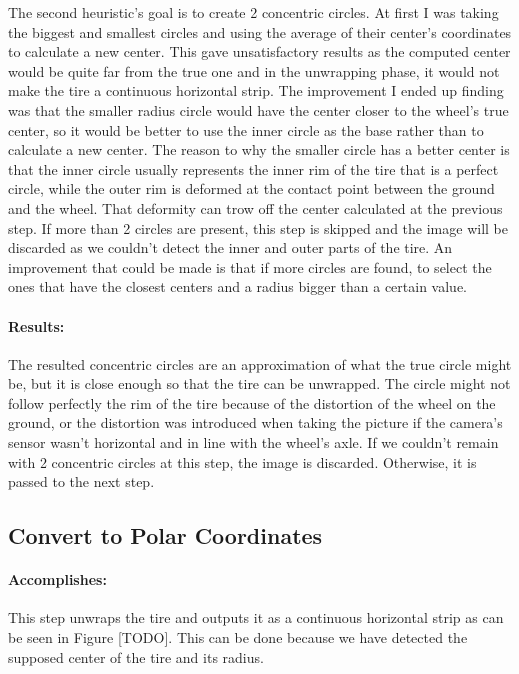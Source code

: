 The second heuristic's goal is to create 2 concentric circles. At first I was taking the biggest and smallest circles and using the average of their center's coordinates to calculate a new center. This gave unsatisfactory results as the computed center would be quite far from the true one and in the unwrapping phase, it would not make the tire a continuous horizontal strip. The improvement I ended up finding was that the smaller radius circle would have the center closer to the wheel's true center, so it would be better to use the inner circle as the base rather than to calculate a new center. The reason to why the smaller circle has a better center is that the inner circle usually represents the inner rim of the tire that is a perfect circle, while the outer rim is deformed at the contact point between the ground and the wheel. That deformity can trow off the center calculated at the previous step. If more than 2 circles are present, this step is skipped and the image will be discarded as we couldn't detect the inner and outer parts of the tire. An improvement that could be made is that if more circles are found, to select the ones that have the closest centers and a radius bigger than a certain value.

\paragraph*{Results:}\mbox{}\par
The resulted concentric circles are an approximation of what the true circle might be, but it is close enough so that the tire can be unwrapped. The circle might not follow perfectly the rim of the tire because of the distortion of the wheel on the ground, or the distortion was introduced when taking the picture if the camera's sensor wasn't horizontal and in line with the wheel's axle. If we couldn't remain with 2 concentric circles at this step, the image is discarded. Otherwise, it is passed to the next step.

\subsection{Convert to Polar Coordinates}

\paragraph*{Accomplishes:}\mbox{}\par
This step unwraps the tire and outputs it as a continuous horizontal strip as can be seen in Figure [TODO]. This can be done because we have detected the supposed center of the tire and its radius.

